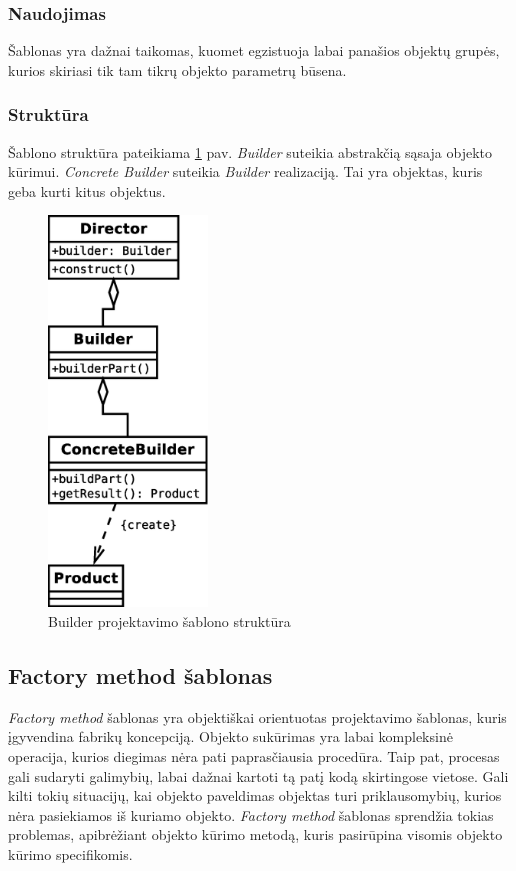 \documentclass[10pt]{IEEEtran}
\begin{document}
			\subsubsection{Naudojimas}

				Šablonas yra dažnai taikomas, kuomet egzistuoja labai panašios objektų grupės, kurios skiriasi tik tam tikrų objekto parametrų būsena.

			\subsubsection{Struktūra}

				Šablono struktūra pateikiama \ref{fig:builder_pattern} pav. \textit{Builder} suteikia abstrakčią sąsaja objekto kūrimui. \textit{Concrete Builder} suteikia \textit{Builder} realizaciją. Tai yra objektas, kuris geba kurti kitus objektus. 

				\begin{figure}[t]
					\centering
					\includegraphics[width=160px]{diagrams/builder_pattern.eps}
					\caption{Builder projektavimo šablono struktūra}
					\label{fig:builder_pattern}
				\end{figure}

		\subsection{Factory method šablonas}

			\textit{Factory method} šablonas yra objektiškai orientuotas projektavimo šablonas, kuris įgyvendina fabrikų koncepciją. Objekto sukūrimas yra labai kompleksinė operacija, kurios diegimas nėra pati paprasčiausia procedūra. Taip pat, procesas gali sudaryti galimybių, labai dažnai kartoti tą patį kodą skirtingose vietose. Gali kilti tokių situacijų, kai objekto paveldimas objektas turi priklausomybių, kurios nėra pasiekiamos iš kuriamo objekto. \textit{Factory method} šablonas sprendžia tokias problemas, apibrėžiant objekto kūrimo metodą, kuris pasirūpina visomis objekto kūrimo specifikomis. 
\end{document}
